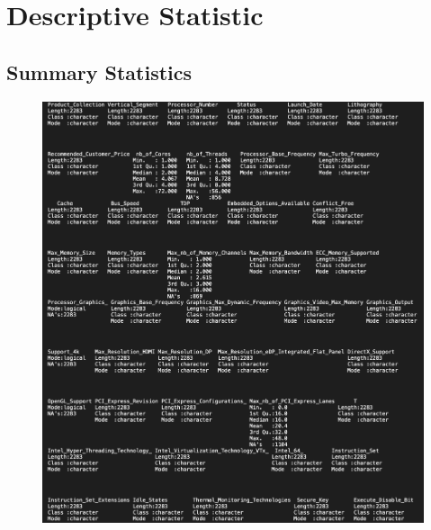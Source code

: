 \section{Descriptive Statistic}

\subsection{Summary Statistics}
\begin{figure}[H]
    \begin{center}
    \includegraphics[width=14cm]{graphics/summary.png}
    \end{center}
\end{figure}

